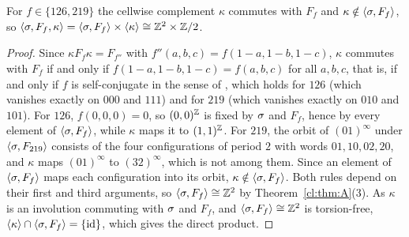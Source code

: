 \begin{proposition}\label{cl:prop:kappa}
For $f\in\{126,219\}$ the cellwise complement $\kappa$ commutes with $F_f$ and $\kappa\notin\langle\sigma,F_f\rangle$, so $\langle\sigma,F_f,\kappa\rangle=\langle\sigma,F_f\rangle\times\langle\kappa\rangle\cong\mathbb{Z}^2\times\mathbb{Z}/2$.
\end{proposition}

\begin{proof}
Since $\kappa F_f\kappa=F_{f''}$ with $f''(a,b,c)=f(1-a,1-b,1-c)$, $\kappa$ commutes with $F_f$ if and only if $f(1-a,1-b,1-c)=f(a,b,c)$ for all $a,b,c$, that is, if and only if $f$ is self-conjugate in the sense of \cite[Appendix~A]{Takesue1989}, which holds for $126$ (which vanishes exactly on $000$ and $111$) and for $219$ (which vanishes exactly on $010$ and $101$). For $126$, $f(0,0,0)=0$, so $(0,0)^{\mathbb{Z}}$ is fixed by $\sigma$ and $F_f$, hence by every element of $\langle\sigma,F_f\rangle$, while $\kappa$ maps it to $(1,1)^{\mathbb{Z}}$. For $219$, the orbit of $(01)^{\infty}$ under $\langle\sigma,F_{219}\rangle$ consists of the four configurations of period $2$ with words $01,10,02,20$, and $\kappa$ maps $(01)^{\infty}$ to $(32)^{\infty}$, which is not among them. Since an element of $\langle\sigma,F_f\rangle$ maps each configuration into its orbit, $\kappa\notin\langle\sigma,F_f\rangle$. Both rules depend on their first and third arguments, so $\langle\sigma,F_f\rangle\cong\mathbb{Z}^2$ by Theorem~\ref{cl:thm:A}(3). As $\kappa$ is an involution commuting with $\sigma$ and $F_f$, and $\langle\sigma,F_f\rangle\cong\mathbb{Z}^2$ is torsion-free, $\langle\kappa\rangle\cap\langle\sigma,F_f\rangle=\{\mathrm{id}\}$, which gives the direct product.
\end{proof}
